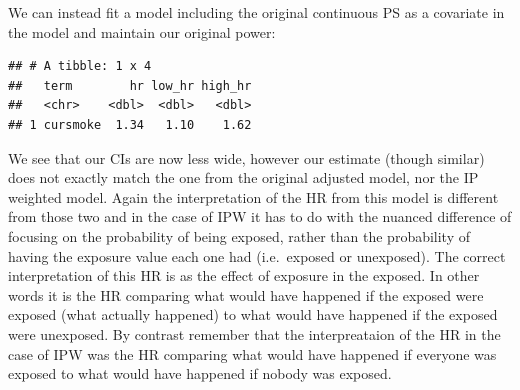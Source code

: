 \documentclass[
]{book}
\newenvironment{Shaded}{\begin{snugshade}}{\end{snugshade}}
\newcommand{\DataTypeTok}[1]{\textcolor[rgb]{0.13,0.29,0.53}{#1}}
\newcommand{\FloatTok}[1]{\textcolor[rgb]{0.00,0.00,0.81}{#1}}
\newcommand{\KeywordTok}[1]{\textcolor[rgb]{0.13,0.29,0.53}{\textbf{#1}}}
\newcommand{\NormalTok}[1]{#1}
\newcommand{\OperatorTok}[1]{\textcolor[rgb]{0.81,0.36,0.00}{\textbf{#1}}}
\newcommand{\StringTok}[1]{\textcolor[rgb]{0.31,0.60,0.02}{#1}}
\begin{document}
We can instead fit a model including the original continuous PS as a covariate in the model and maintain our original power:

\begin{Shaded}
\end{Shaded}

\begin{verbatim}
## # A tibble: 1 x 4
##   term        hr low_hr high_hr
##   <chr>    <dbl>  <dbl>   <dbl>
## 1 cursmoke  1.34   1.10    1.62
\end{verbatim}

We see that our CIs are now less wide, however our estimate (though similar) does not exactly match the one from the original adjusted model, nor the IP weighted model. Again the interpretation of the HR from this model is different from those two and in the case of IPW it has to do with the nuanced difference of focusing on the probability of being exposed, rather than the probability of having the exposure value each one had (i.e.~exposed or unexposed). The correct interpretation of this HR is as the effect of exposure in the exposed. In other words it is the HR comparing what would have happened if the exposed were exposed (what actually happened) to what would have happened if the exposed were unexposed. By contrast remember that the interpreataion of the HR in the case of IPW was the HR comparing what would have happened if everyone was exposed to what would have happened if nobody was exposed.
\end{document}
